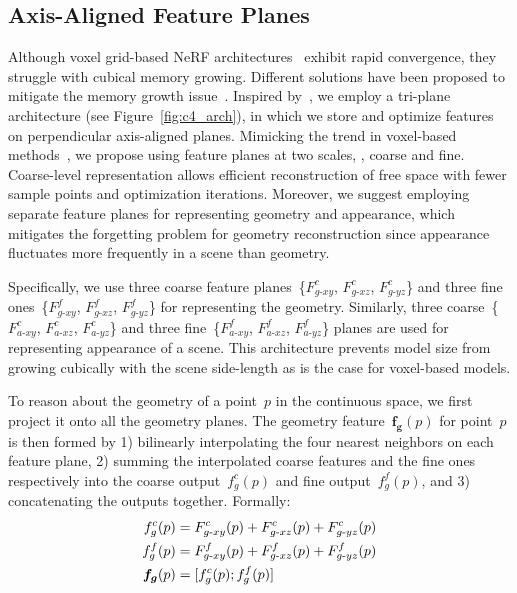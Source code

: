\subsection{Axis-Aligned Feature Planes} \label{sec:c4_feat_planes}
Although voxel grid-based NeRF architectures~\citep{fridovich2022plenoxels, sun2022direct, wang2022go} exhibit rapid convergence, they struggle with cubical memory growing. Different solutions have been proposed to mitigate the memory growth issue~\citep{muller2022instant, Chen2022ECCV, chan2022efficient}. Inspired by~\cite{chan2022efficient}, we employ a tri-plane architecture (see Figure~\ref{fig:c4_arch}), in which we store and optimize features on perpendicular axis-aligned planes. Mimicking the trend in voxel-based methods~\citep{muller2022instant, sun2022direct, Chen2022ECCV}, we propose using feature planes at two scales, \ie, coarse and fine. Coarse-level representation allows efficient reconstruction of free space with fewer sample points and optimization iterations. Moreover, we suggest employing separate feature planes for representing geometry and appearance, which mitigates the forgetting problem for geometry reconstruction since appearance fluctuates more frequently in a scene than geometry.

Specifically, we use three coarse feature planes~\{$F^{c}_{g\text{-}xy}$, $F^{c}_{g\text{-}xz}$, $F^{c}_{g\text{-}yz}$\} and three fine ones~\{$F^{f}_{g\text{-}xy}$, $F^{f}_{g\text{-}xz}$, $F^{f}_{g\text{-}yz}$\} for representing the geometry. Similarly, three coarse~\{$F^{c}_{a\text{-}xy}$, $F^{c}_{a\text{-}xz}$, $F^{c}_{a\text{-}yz}$\} and three fine~\{$F^{f}_{a\text{-}xy}$, $F^{f}_{a\text{-}xz}$, $F^{f}_{a\text{-}yz}$\} planes are used for representing appearance of a scene. This architecture prevents model size from growing cubically with the scene side-length as is the case for voxel-based models.

To reason about the geometry of a point~$p$ in the continuous space, we first project it onto all the geometry planes. The geometry feature~$\boldsymbol{f_{g}}(p)$ for point~$p$ is then formed by 1) bilinearly interpolating the four nearest neighbors on each feature plane, 2) summing the interpolated coarse features and the fine ones respectively into the coarse output~$f^{c}_{g}(p)$ and fine output~$f^{f}_{g}(p)$, and 3) concatenating the outputs together. Formally: 
\begin{align}
	f^{c}_{g}(p) &= F^{c}_{g\text{-}xy}(p) + F^{c}_{g\text{-}xz}(p) + F^{c}_{g\text{-}yz}(p) \notag \\
	f^{f}_{g}(p) &= F^{f}_{g\text{-}xy}(p) + F^{f}_{g\text{-}xz}(p) + F^{f}_{g\text{-}yz}(p) \notag \\
	\boldsymbol{f_{g}}(p) &= [f^{c}_{g}(p) ; f^{f}_{g}(p)]
\end{align}

